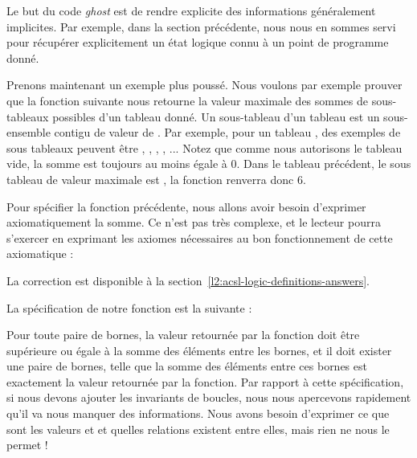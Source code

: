 

Le but du code \textit{ghost} est de rendre explicite des informations généralement
implicites. Par exemple, dans la section précédente, nous nous en sommes servi
pour récupérer explicitement un état logique connu à un point de programme
donné.



Prenons maintenant un exemple plus poussé. Nous voulons par exemple prouver que
la fonction suivante nous retourne la valeur maximale des sommes de sous-tableaux possibles d'un tableau donné. Un sous-tableau d'un tableau  est un
sous-ensemble contigu de valeur de . Par exemple, pour un tableau ,
des exemples de sous tableaux peuvent être \CodeInline{\{\}}, , 
, , ... Notez que comme nous autorisons le tableau vide,
la somme est toujours au moins égale à 0. Dans le tableau précédent, le sous
tableau de valeur maximale est , la fonction renverra donc 6.






Pour spécifier la fonction précédente, nous allons avoir besoin d'exprimer
axiomatiquement la somme. Ce n'est pas très complexe, et le lecteur pourra
s'exercer en exprimant les axiomes nécessaires au bon fonctionnement de cette
axiomatique :






La correction est disponible à la section~\ref{l2:acsl-logic-definitions-answers}.


La spécification de notre fonction est la suivante :






Pour toute paire de bornes, la valeur retournée par la fonction doit être
supérieure ou égale à la somme des éléments entre les bornes, et il doit exister
une paire de bornes, telle que la somme des éléments entre ces bornes est
exactement la valeur retournée par la fonction. Par rapport à cette spécification,
si nous devons ajouter les invariants de boucles, nous nous apercevons rapidement
qu'il va nous manquer des informations. Nous avons besoin d'exprimer ce que sont
les valeurs  et  et quelles relations existent entre elles,
mais rien ne nous le permet !



